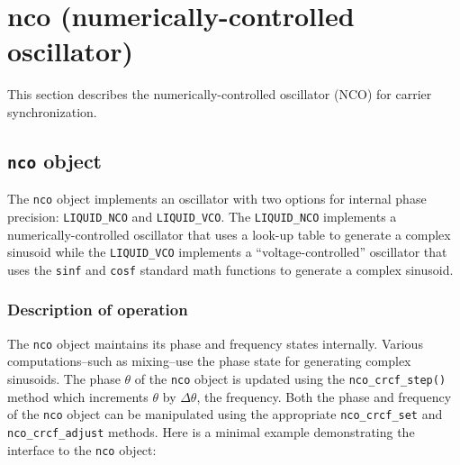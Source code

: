 % 
%

\newpage
\section{nco (numerically-controlled oscillator)}
\label{module:nco}
This section describes the numerically-controlled oscillator (NCO) for carrier
synchronization.

\subsection{{\tt nco} object}
\label{module:nco:nco}
The {\tt nco} object implements an oscillator with two options for internal
phase precision: {\tt LIQUID\_NCO} and {\tt LIQUID\_VCO}.
The {\tt LIQUID\_NCO} implements a numerically-controlled oscillator that uses
a look-up table to generate a complex sinusoid while
the {\tt LIQUID\_VCO} implements a ``voltage-controlled'' oscillator that uses
the {\tt sinf} and {\tt cosf} standard math functions to generate a complex
sinusoid.

\subsubsection{Description of operation}
The {\tt nco} object maintains its phase and frequency states internally.
Various computations--such as mixing--use the phase state for generating
complex sinusoids.
The phase $\theta$ of the {\tt nco} object is updated using the
{\tt nco\_crcf\_step()} method which increments $\theta$ by $\Delta\theta$, the
frequency.
Both the phase and frequency of the {\tt nco} object can be manipulated using
the appropriate {\tt nco\_crcf\_set} and {\tt nco\_crcf\_adjust} methods.
%
Here is a minimal example demonstrating the interface to the {\tt nco}
object:
%

%


